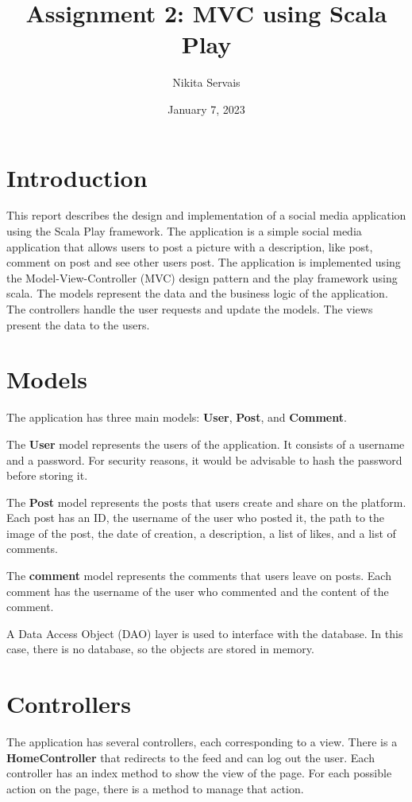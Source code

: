 \documentclass{article}
\author{Nikita Servais}
\title{Assignment 2: MVC using Scala Play}
\date{January 7, 2023}
\begin{document}
    \maketitle


    \section{Introduction}
    This report describes the design and implementation of a social media application using the Scala Play framework.
    The application is a simple social media application that allows users to post a picture with a description, like post, comment on post and see other users post.
    The application is implemented using the Model-View-Controller (MVC) design pattern and the play framework using scala.
    The models represent the data and the business logic of the application.
    The controllers handle the user requests and update the models.
    The views present the data to the users.


    \section{Models}
    The application has three main models: \textbf{User}, \textbf{Post}, and \textbf{Comment}.

    The \textbf{User} model represents the users of the application.
    It consists of a username and a password.
    For security reasons, it would be advisable to hash the password before storing it.

    The \textbf{Post} model represents the posts that users create and share on the platform.
    Each post has an ID, the username of the user who posted it, the path to the image of the post, the date of creation, a description, a list of likes, and a list of comments.

    
    The \textbf{comment} model represents the comments that users leave on posts.
    Each comment has the username of the user who commented and the content of the comment.

    A Data Access Object (DAO) layer is used to interface with the database.
    In this case, there is no database, so the objects are stored in memory.


    \section{Controllers}
    The application has several controllers, each corresponding to a view.
    There is a \textbf{HomeController} that redirects to the feed and can log out the user.
    Each controller has an index method to show the view of the page.
    For each possible action on the page, there is a method to manage that action.
\end{document}
